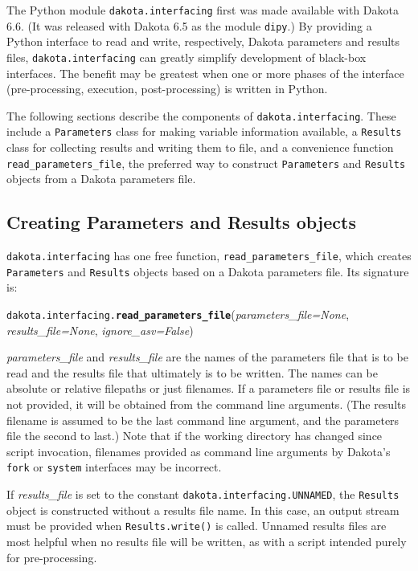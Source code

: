 The Python module {\tt dakota.interfacing} first was made available with Dakota 6.6. (It was released with Dakota 6.5 as the module {\tt dipy}.) By providing a Python interface to read and write, respectively, Dakota parameters and results files, {\tt dakota.interfacing} can greatly simplify development of black-box interfaces. The benefit may be greatest when one or more phases of the interface (pre-processing, execution, post-processing) is written in Python.

The following sections describe the components of {\tt dakota.interfacing}. These include a {\tt Parameters} class for making variable information available, a {\tt Results} class for collecting results and writing them to file, and a convenience function {\tt read\_parameters\_file}, the preferred way to construct {\tt Parameters} and {\tt Results} objects from a Dakota parameters file.

\subsection{Creating Parameters and Results objects}

{\tt dakota.interfacing} has one free function, {\tt read\_parameters\_file}, which creates {\tt Parameters} and {\tt Results} objects based on a Dakota parameters file. Its signature is:

\label{index:dakota.interfacing.read_parameters_file}\texttt{dakota.interfacing.}\textbf{\texttt{read\_parameters\_file}}({\emph{parameters\_file=None}, \emph{results\_file=None}, \emph{ignore\_asv=False}}){}

\emph{parameters\_file} and \emph{results\_file} are the names of the parameters file that is to be read and the results file that  ultimately is to be written. The names can be  absolute or relative filepaths or just filenames. If a parameters file or results file is not provided, it will be obtained from the command line arguments. (The results filename is assumed to be the last command line argument, and the parameters file the second to last.) Note that if the working directory has changed since script invocation, filenames provided as command line arguments by Dakota's {\tt fork} or {\tt system} interfaces may be incorrect.

If \emph{results\_file} is set to the constant {\tt dakota.interfacing.UNNAMED}, the {\tt Results} object is constructed without a results file name.  In this case, an output stream must be provided when {\tt Results.write()} is called. Unnamed results files are most helpful when no results file will be written, as with a script intended purely for pre-processing.

